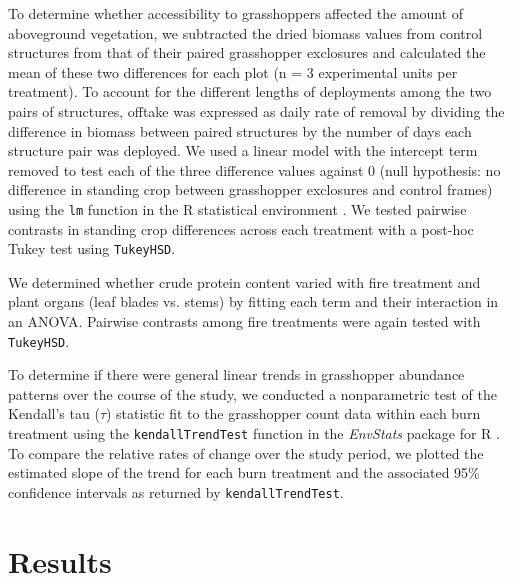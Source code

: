 \documentclass[referee, 
	            sn-basic]
           {sn-jnl}
\begin{document}
\begin{linenumbers}
To determine whether accessibility to grasshoppers affected the amount of aboveground vegetation, we subtracted the dried biomass values from control structures from that of their paired grasshopper exclosures and calculated the mean of these two differences for each plot (n = 3 experimental units per treatment). 
To account for the different lengths of deployments among the two pairs of structures, offtake was expressed as daily rate of removal by dividing the difference in biomass between paired structures by the number of days each structure pair was deployed.  
We used a linear model with the intercept term removed to test each of the three difference values against 0 (null hypothesis: no difference in standing crop between grasshopper exclosures and control frames) using the \texttt{lm} function in the \textsf{R} statistical environment \citep{Rcore2020}. 
We tested pairwise contrasts in standing crop differences across each treatment with a post-hoc Tukey test using \texttt{TukeyHSD}.

We determined whether crude protein content varied with fire treatment and plant organs (leaf blades vs. stems) by fitting each term and their interaction in an ANOVA.
Pairwise contrasts among fire treatments were again tested with \texttt{TukeyHSD}.

To determine if there were general linear trends in grasshopper abundance patterns over the course of the study, we conducted a nonparametric test of the Kendall's tau (\(\tau\)) statistic fit to the grasshopper count data within each burn treatment using the \texttt{kendallTrendTest} function in the \emph{EnvStats} package for
\textsf{R} \citep{millard2013}.
To compare the relative rates of change over the study period, we plotted the estimated slope of the trend for each burn treatment and the associated 95\% confidence intervals as returned by \texttt{kendallTrendTest}.

\section{Results}


\end{linenumbers}
\end{document}
